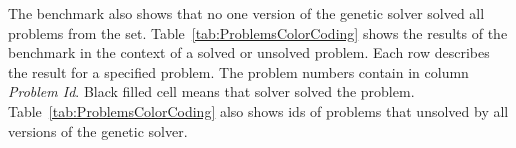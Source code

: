 The benchmark also shows that no one version of the genetic solver solved all problems from the set. Table~\ref{tab:ProblemsColorCoding} shows the results of the benchmark in the context of a solved or unsolved problem. Each row describes the result for a specified problem. The problem numbers contain in column \textit{Problem Id}. Black filled cell means that solver solved the problem. Table~\ref{tab:ProblemsColorCoding} also shows ids of problems that unsolved by all versions of the genetic solver.

\begin{table}
	\centering
	\caption{Problem color coding}\label{tab:ProblemsColorCoding}
\end{table}
